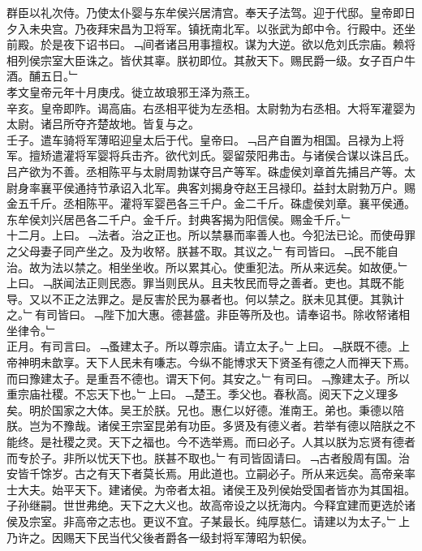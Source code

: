 \documentclass{zhvt-classic}
\begin{document}
\hspace*{2em}群臣以礼次侍。乃使太仆婴与东牟侯兴居清宫。奉天子法驾。迎于代邸。皇帝即日夕入未央宫。乃夜拜宋昌为卫将军。镇抚南北军。以张武为郎中令。行殿中。还坐前殿。於是夜下诏书曰。﹁间者诸吕用事擅权。谋为大逆。欲以危刘氏宗庙。赖将相列侯宗室大臣诛之。皆伏其辜。朕初即位。其赦天下。赐民爵一级。女子百户牛酒。酺五日。﹂\\
\hspace*{2em}孝文皇帝元年十月庚戌。徙立故琅邪王泽为燕王。\\
\hspace*{2em}辛亥。皇帝即阼。谒高庙。右丞相平徙为左丞相。太尉勃为右丞相。大将军灌婴为太尉。诸吕所夺齐楚故地。皆复与之。\\
\hspace*{2em}壬子。遣车骑将军薄昭迎皇太后于代。皇帝曰。﹁吕产自置为相国。吕禄为上将军。擅矫遣灌将军婴将兵击齐。欲代刘氏。婴留荥阳弗击。与诸侯合谋以诛吕氏。吕产欲为不善。丞相陈平与太尉周勃谋夺吕产等军。硃虚侯刘章首先捕吕产等。太尉身率襄平侯通持节承诏入北军。典客刘揭身夺赵王吕禄印。益封太尉勃万户。赐金五千斤。丞相陈平。灌将军婴邑各三千户。金二千斤。硃虚侯刘章。襄平侯通。东牟侯刘兴居邑各二千户。金千斤。封典客揭为阳信侯。赐金千斤。﹂\\
\hspace*{2em}十二月。上曰。﹁法者。治之正也。所以禁暴而率善人也。今犯法已论。而使毋罪之父母妻子同产坐之。及为收帑。朕甚不取。其议之。﹂有司皆曰。﹁民不能自治。故为法以禁之。相坐坐收。所以累其心。使重犯法。所从来远矣。如故便。﹂上曰。﹁朕闻法正则民悫。罪当则民从。且夫牧民而导之善者。吏也。其既不能导。又以不正之法罪之。是反害於民为暴者也。何以禁之。朕未见其便。其孰计之。﹂有司皆曰。﹁陛下加大惠。德甚盛。非臣等所及也。请奉诏书。除收帑诸相坐律令。﹂\\
\hspace*{2em}正月。有司言曰。﹁蚤建太子。所以尊宗庙。请立太子。﹂上曰。﹁朕既不德。上帝神明未歆享。天下人民未有嗛志。今纵不能博求天下贤圣有德之人而禅天下焉。而曰豫建太子。是重吾不德也。谓天下何。其安之。﹂有司曰。﹁豫建太子。所以重宗庙社稷。不忘天下也。﹂上曰。﹁楚王。季父也。春秋高。阅天下之义理多矣。明於国家之大体。吴王於朕。兄也。惠仁以好德。淮南王。弟也。秉德以陪朕。岂为不豫哉。诸侯王宗室昆弟有功臣。多贤及有德义者。若举有德以陪朕之不能终。是社稷之灵。天下之福也。今不选举焉。而曰必子。人其以朕为忘贤有德者而专於子。非所以忧天下也。朕甚不取也。﹂有司皆固请曰。﹁古者殷周有国。治安皆千馀岁。古之有天下者莫长焉。用此道也。立嗣必子。所从来远矣。高帝亲率士大夫。始平天下。建诸侯。为帝者太祖。诸侯王及列侯始受国者皆亦为其国祖。子孙继嗣。世世弗绝。天下之大义也。故高帝设之以抚海内。今释宜建而更选於诸侯及宗室。非高帝之志也。更议不宜。子某最长。纯厚慈仁。请建以为太子。﹂上乃许之。因赐天下民当代父後者爵各一级封将军薄昭为轵侯。\\
\end{document}

